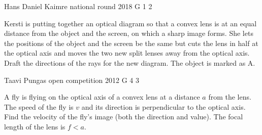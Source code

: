 \documentclass[11pt]{article}
\begin{document}
{Hans Daniel Kaimre} %
{national round} %
{2018} %
{G 1} %
{2} %
{

\ifEngStatement
Kersti is putting together an optical diagram so that a convex lens is at an equal distance from the object and the screen, on which a sharp image forms. She lets the positions of the object and the screen be the same but cuts the lens in half at the optical axis and moves the two new split lenses away from the optical axis. Draft the directions of the rays for the new diagram. The object is marked as A.
\begin{center}
\end{center}
\fi
}

{Taavi Pungas} %
{open competition} %
{2012} %
{G 4} %
{3} %
{

\ifEngStatement
A fly is flying on the optical axis of a convex lens at a distance $a$ from the lens. The speed of the fly is $v$ and its direction is perpendicular to the optical axis. Find the velocity of the fly’s image (both the direction and value). The focal length of the lens is $f < a$.
\fi
}
\end{document}
